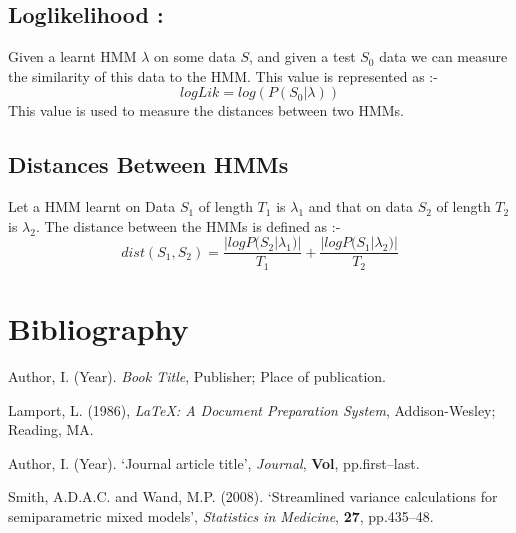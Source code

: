 \def\DevnagVersion{2.15}\documentclass[a4paper, 10pt, notitlepage]{report}
\begin{document}
\section{Loglikelihood :}
Given a learnt HMM $\lambda $ on some data $S$, and given a test $S_0$ data we can measure the similarity of this data to the HMM. This value is represented as :- \\
$$logLik = log(P(S_0 | \lambda))$$
This value is used to measure the distances between two HMMs.\\
\section{Distances Between HMMs}
Let a HMM learnt on Data $S_1$ of length $T_1$ is $\lambda _1$ and that on data $S_2$ of length $T_2$ is $\lambda _ 2$. The distance between the HMMs is defined as :- \\

$$dist(S_1, S_2) = \frac{|logP(S_2|\lambda _ 1)|}{T_1} +\frac{|logP(S_1|\lambda _ 2)|}{T_2} $$
  

\chapter*{Bibliography}
%
\begin{description}

\item Author, I. (Year). \emph{Book Title}, Publisher; Place of publication.

\item Lamport, L. (1986), \emph{\LaTeX: A Document Preparation System}, Addison-Wesley; Reading, MA.

\item Author, I. (Year). `Journal article title', \emph{Journal}, \textbf{Vol}, pp.first--last.

\item Smith, A.D.A.C. and Wand, M.P. (2008). `Streamlined variance calculations for semiparametric
mixed models', \emph{Statistics in Medicine}, \textbf{27}, pp.435--48.

\end{description}
\end{document}
